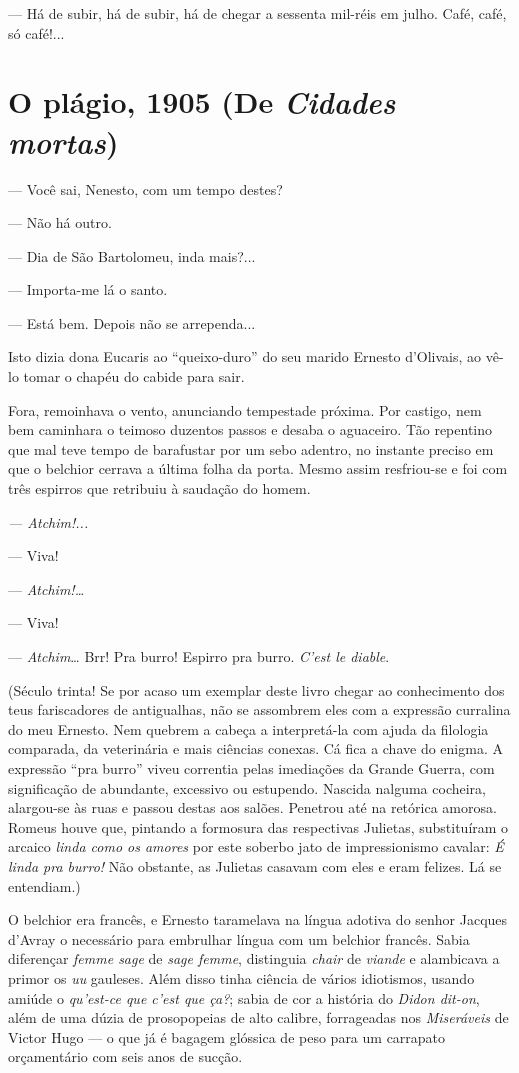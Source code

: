 --- Há de subir, há de subir, há de chegar a sessenta mil-réis em julho.
Café, café, só café!...

\chapter{O plágio, 1905 (De \emph{Cidades mortas})}

--- Você sai, Nenesto, com um tempo destes?

--- Não há outro.

--- Dia de São Bartolomeu, inda mais?...

--- Importa-me lá o santo.

--- Está bem. Depois não se arrependa...

Isto dizia dona Eucaris ao ``queixo-duro'' do seu marido Ernesto
d'Olivais, ao vê-lo tomar o chapéu do cabide para sair.

Fora, remoinhava o vento, anunciando tempestade próxima. Por castigo,
nem bem caminhara o teimoso duzentos passos e desaba o aguaceiro. Tão
repentino que mal teve tempo de barafustar por um sebo adentro, no
instante preciso em que o belchior cerrava a última folha da porta.
Mesmo assim resfriou-se e foi com três espirros que retribuiu à saudação
do homem.

\emph{--- Atchim!...}

--- Viva!

--- \emph{Atchim!\ldots{}}

--- Viva!

--- \emph{Atchim}\ldots{} Brr! Pra burro! Espirro pra burro. \emph{C'est
le diable}.

(Século trinta! Se por acaso um exemplar deste livro chegar ao
conhecimento dos teus fariscadores de antigualhas, não se assombrem eles
com a expressão curralina do meu Ernesto. Nem quebrem a cabeça a
interpretá-la com ajuda da filologia comparada, da veterinária e mais
ciências conexas. Cá fica a chave do enigma. A expressão ``pra burro''
viveu correntia pelas imediações da Grande Guerra, com significação de
abundante, excessivo ou estupendo. Nascida nalguma cocheira, alargou-se
às ruas e passou destas aos salões. Penetrou até na retórica amorosa.
Romeus houve que, pintando a formosura das respectivas Julietas,
substituíram o arcaico \emph{linda como os amores} por este soberbo jato
de impressionismo cavalar: \emph{É linda pra burro!} Não obstante, as
Julietas casavam com eles e eram felizes. Lá se entendiam.)

O belchior era francês, e Ernesto taramelava na língua adotiva do senhor
Jacques d'Avray o necessário para embrulhar língua com um belchior
francês. Sabia diferençar \emph{femme sage} de \emph{sage femme},
distinguia \emph{chair} de \emph{viande} e alambicava a primor os
\emph{uu} gauleses. Além disso tinha ciência de vários idiotismos,
usando amiúde o \emph{qu'est-ce que c'est que ça?}; sabia de cor a
história do \emph{Didon dit-on}, além de uma dúzia de prosopopeias de
alto calibre, forrageadas nos \emph{Miseráveis} de Victor Hugo --- o que
já é bagagem glóssica de peso para um carrapato orçamentário com seis
anos de sucção.

